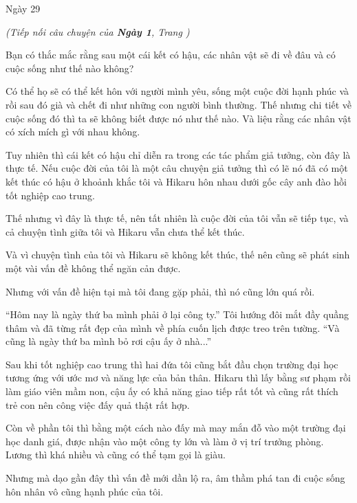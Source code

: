 {Ngày 29
    \label{chap:ngay_29}}
{
    \begin{flushright}
        \small\itshape\textcolor{bunko_gray}{
            (Tiếp nối câu chuyện của \textbf{Ngày 1}, Trang \pageref{chap:ngay_1})
        }
    \end{flushright}
    \vspace{0.5cm}

    Bạn có thắc mắc rằng sau một cái kết có hậu, các nhân vật sẽ đi về đâu
    và có cuộc sống như thế nào không?

    Có thể họ sẽ có thể kết hôn với người mình yêu, sống một cuộc đời hạnh
    phúc và rồi sau đó già và chết đi như những con người bình thường. Thế
    nhưng chi tiết về cuộc sống đó thì ta sẽ không biết được nó như thế nào.
    Và liệu rằng các nhân vật có xích mích gì với nhau không.

    Tuy nhiên thì cái kết có hậu chỉ diễn ra trong các tác phẩm giả tưởng,
    còn đây là thực tế. Nếu cuộc đời của tôi là một câu chuyện giả tưởng thì
    có lẽ nó đã có một kết thúc có hậu ở khoảnh khắc tôi và Hikaru hôn nhau
    dưới gốc cây anh đào hồi tốt nghiệp cao trung.

    Thế nhưng vì đây là thực tế, nên tất nhiên là cuộc đời của tôi vẫn sẽ
    tiếp tục, và cả chuyện tình giữa tôi và Hikaru vẫn chưa thể kết thúc.

    Và vì chuyện tình của tôi và Hikaru sẽ không kết thúc, thế nên cũng sẽ
    phát sinh một vài vấn đề không thể ngăn cản được.

    Nhưng với vấn đề hiện tại mà tôi đang gặp phải, thì nó cũng lớn quá rồi.

    ``Hôm nay là ngày thứ ba mình phải ở lại công ty.'' Tôi hướng đôi mắt
    đầy quầng thâm và đã từng rất đẹp của mình về phía cuốn lịch được treo
    trên tường. ``Và cũng là ngày thứ ba mình bỏ rơi cậu ấy ở nhà...''

    Sau khi tốt nghiệp cao trung thì hai đứa tôi cũng bắt đầu chọn trường
    đại học tương ứng với ước mơ và năng lực của bản thân. Hikaru thì lấy
    bằng sư phạm rồi làm giáo viên mầm non, cậu ấy có khả năng giao tiếp rất
    tốt và cũng rất thích trẻ con nên công việc đấy quả thật rất hợp.

    Còn về phần tôi thì bằng một cách nào đấy mà may mắn đỗ vào một trường
    đại học danh giá, được nhận vào một công ty lớn và làm ở vị trí trưởng
    phòng. Lương thì khá nhiều và cũng có thể tạm gọi là giàu.

    Nhưng mà dạo gần đây thì vấn đề mới dần lộ ra, âm thầm phá tan đi cuộc
    sống hôn nhân vô cũng hạnh phúc của tôi.

}
